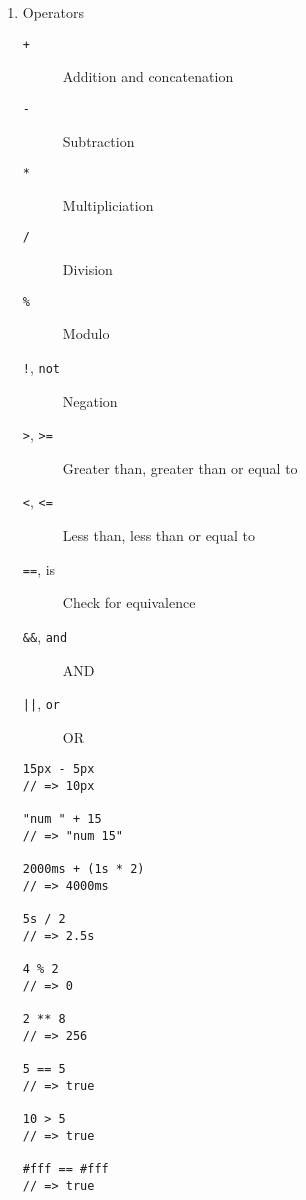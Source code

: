 \documentclass[10pt, twocolumn]{article}
\begin{document}
\begin{enumerate}

\item Operators
\begin{description}
\item[\texttt{+}] Addition and concatenation
\item[\texttt{-}] Subtraction
\item[\texttt{*}] Multipliciation
\item[\texttt{/}] Division
\item[\texttt{\%}] Modulo
\item[\texttt{!}, \texttt{not}] Negation
\item[\texttt{>}, \texttt{>=}] Greater than, greater than or equal to
\item[\texttt{<}, \texttt{<=}] Less than, less than or equal to
\item[\texttt{==}, is] Check for equivalence
\item[\texttt{\&\&}, \texttt{and}] AND
\item[\texttt{||}, \texttt{or}] OR
\end{description}
\begin{lstlisting}[frame=single]
15px - 5px
// => 10px

"num " + 15
// => "num 15"

2000ms + (1s * 2)
// => 4000ms

5s / 2
// => 2.5s

4 % 2
// => 0

2 ** 8
// => 256

5 == 5
// => true

10 > 5
// => true

#fff == #fff
// => true


\end{lstlisting}
\end{enumerate}
\end{document}
